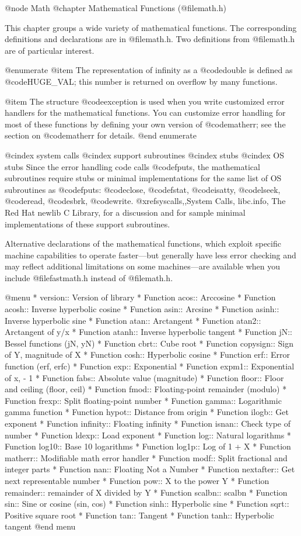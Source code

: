 @node Math
@chapter Mathematical Functions (@file{math.h})

This chapter groups a wide variety of mathematical functions.  The
corresponding definitions and declarations are in @file{math.h}.  
Two definitions from @file{math.h} are of particular interest.  

@enumerate
@item
The representation of infinity as a @code{double} is defined as
@code{HUGE_VAL}; this number is returned on overflow by many functions.

@item
The structure @code{exception} is used when you write customized error
handlers for the mathematical functions.  You can customize error
handling for most of these functions by defining your own version of
@code{matherr}; see the section on @code{matherr} for details.
@end enumerate

@cindex system calls
@cindex support subroutines
@cindex stubs
@cindex OS stubs
Since the error handling code calls @code{fputs}, the mathematical
subroutines require stubs or minimal implementations for the same list
of OS subroutines as @code{fputs}: @code{close}, @code{fstat},
@code{isatty}, @code{lseek}, @code{read}, @code{sbrk}, @code{write}.
@xref{syscalls,,System Calls, libc.info, The Red Hat newlib C Library},
for a discussion and for sample minimal implementations of these support
subroutines.

Alternative declarations of the mathematical functions, which exploit
specific machine capabilities to operate faster---but generally have
less error checking and may reflect additional limitations on some
machines---are available when you include @file{fastmath.h} instead of
@file{math.h}.

@menu 
* version::	Version of library
* Function acos::	Arccosine
* Function acosh::	Inverse hyperbolic cosine
* Function asin::	Arcsine
* Function asinh::	Inverse hyperbolic sine
* Function atan::	Arctangent
* Function atan2::	Arctangent of y/x
* Function atanh::	Inverse hyperbolic tangent
* Function jN::	        Bessel functions  (jN, yN)
* Function cbrt::	Cube root
* Function copysign::	Sign of Y, magnitude of X
* Function cosh::	Hyperbolic cosine
* Function erf::		Error function  (erf, erfc)
* Function exp::		Exponential
* Function expm1::	Exponential of x, - 1
* Function fabs::	Absolute value (magnitude)
* Function floor::	Floor and ceiling  (floor, ceil)
* Function fmod::	Floating-point remainder (modulo)
* Function frexp::	Split floating-point number
* Function gamma::	Logarithmic gamma function
* Function hypot::	Distance from origin
* Function ilogb::	Get exponent
* Function infinity::	Floating infinity
* Function isnan::	Check type of number
* Function ldexp::	Load exponent
* Function log::		Natural logarithms
* Function log10::	Base 10 logarithms
* Function log1p::	Log of 1 + X
* Function matherr::	Modifiable math error handler
* Function modf::	Split fractional and integer parts
* Function nan::		Floating Not a Number
* Function nextafter::	Get next representable number
* Function pow::		X to the power Y
* Function remainder::	remainder of X divided by Y
* Function scalbn::	scalbn
* Function sin::		Sine or cosine (sin, cos)
* Function sinh::	Hyperbolic sine
* Function sqrt::	Positive square root
* Function tan::		Tangent
* Function tanh::	Hyperbolic tangent
@end menu

